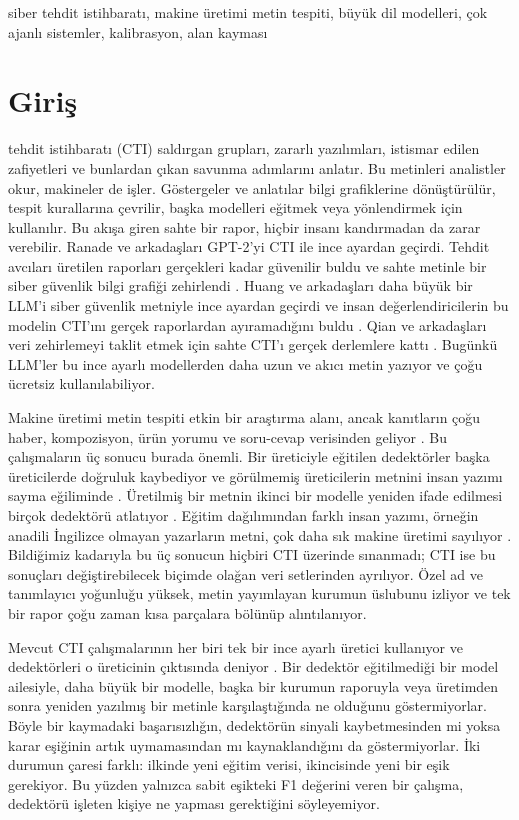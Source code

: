 \documentclass[journal]{IEEEtran}
\begin{document}
\begin{IEEEkeywords}
siber tehdit istihbaratı, makine üretimi metin tespiti, büyük dil modelleri, çok ajanlı sistemler, kalibrasyon,
alan kayması
\end{IEEEkeywords}

\section{Giriş}
 tehdit istihbaratı (CTI) saldırgan grupları, zararlı yazılımları, istismar edilen zafiyetleri
ve bunlardan çıkan savunma adımlarını anlatır. Bu metinleri analistler okur, makineler de işler. Göstergeler ve
anlatılar bilgi grafiklerine dönüştürülür, tespit kurallarına çevrilir, başka modelleri eğitmek veya yönlendirmek
için kullanılır. Bu akışa giren sahte bir rapor, hiçbir insanı kandırmadan da zarar verebilir. Ranade ve arkadaşları
GPT-2'yi CTI ile ince ayardan geçirdi. Tehdit avcıları üretilen raporları gerçekleri kadar güvenilir buldu ve sahte
metinle bir siber güvenlik bilgi grafiği zehirlendi \cite{Ranade_2021}. Huang ve arkadaşları daha büyük bir LLM'i
siber güvenlik metniyle ince ayardan geçirdi ve insan değerlendiricilerin bu modelin CTI'ını gerçek raporlardan
ayıramadığını buldu \cite{Huang_2025}. Qian ve arkadaşları veri zehirlemeyi taklit etmek için sahte CTI'ı gerçek
derlemlere kattı \cite{Qian_2025}. Bugünkü LLM'ler bu ince ayarlı modellerden daha uzun ve akıcı metin yazıyor ve
çoğu ücretsiz kullanılabiliyor.

Makine üretimi metin tespiti etkin bir araştırma alanı, ancak kanıtların çoğu haber, kompozisyon, ürün yorumu ve
soru-cevap verisinden geliyor \cite{Wang_2024,Dugan_2024,Wu_2024}. Bu çalışmaların üç sonucu burada önemli. Bir
üreticiyle eğitilen dedektörler başka üreticilerde doğruluk kaybediyor ve görülmemiş üreticilerin metnini insan
yazımı sayma eğiliminde \cite{Wang_2024,Dugan_2024}. Üretilmiş bir metnin ikinci bir modelle yeniden ifade edilmesi
birçok dedektörü atlatıyor \cite{Krishna_2023,Sadasivan_2023}. Eğitim dağılımından farklı insan yazımı, örneğin
anadili İngilizce olmayan yazarların metni, çok daha sık makine üretimi sayılıyor \cite{Liang_2023}. Bildiğimiz
kadarıyla bu üç sonucun hiçbiri CTI üzerinde sınanmadı; CTI ise bu sonuçları değiştirebilecek biçimde olağan veri
setlerinden ayrılıyor. Özel ad ve tanımlayıcı yoğunluğu yüksek, metin yayımlayan kurumun üslubunu izliyor ve tek
bir rapor çoğu zaman kısa parçalara bölünüp alıntılanıyor.

Mevcut CTI çalışmalarının her biri tek bir ince ayarlı üretici kullanıyor ve dedektörleri o üreticinin çıktısında
deniyor \cite{Ranade_2021,Huang_2025,Qian_2025}. Bir dedektör eğitilmediği bir model ailesiyle, daha büyük bir
modelle, başka bir kurumun raporuyla veya üretimden sonra yeniden yazılmış bir metinle karşılaştığında ne olduğunu
göstermiyorlar. Böyle bir kaymadaki başarısızlığın, dedektörün sinyali kaybetmesinden mi yoksa karar eşiğinin artık
uymamasından mı kaynaklandığını da göstermiyorlar. İki durumun çaresi farklı: ilkinde yeni eğitim verisi,
ikincisinde yeni bir eşik gerekiyor. Bu yüzden yalnızca sabit eşikteki F1 değerini veren bir çalışma, dedektörü
işleten kişiye ne yapması gerektiğini söyleyemiyor.
\end{document}
